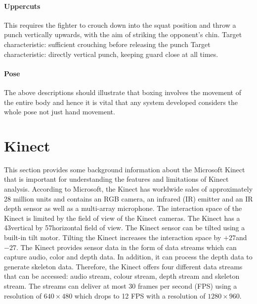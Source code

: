 \paragraph{Uppercuts}
This requires the fighter to crouch down into the squat position and throw a punch vertically upwards, with the aim of striking the opponent's chin.\newline
Target characteristic: sufficient crouching before releasing the punch\newline
Target characteristic: directly vertical punch, keeping guard close at all times.\newline

\paragraph{Pose}
The above descriptions should illustrate that boxing involves the movement of the entire body and hence it is vital that any system developed considers the whole pose not just hand movement.

\section{Kinect}
This section provides some background information about the Microsoft Kinect that is important for understanding the features and limitations of Kinect analysis. According to Microsoft, the Kinect  has worldwide sales of approximately 28 million units and contains an RGB camera, an infrared (IR) emitter and an IR depth sensor as well as a multi-array microphone. The interaction space of the Kinect is limited by the field of view of the Kinect cameras. The Kinect has a 43\degree  vertical by 57\degree  horizontal field of view. The Kinect sensor can be tilted using a built-in tilt motor. Tilting the Kinect increases the interaction space by $+27$\degree and $-27$\degree.
The Kinect provides sensor data in the form of data streams which can capture audio, color and depth data. In addition, it can process the depth data to generate skeleton data. Therefore, the Kinect offers four different data streams that can be accessed: audio stream, colour stream, depth stream and skeleton stream. The streams can deliver at most 30 frames per second (FPS) using a resolution of $640\times480$ which drops to 12 FPS with a resolution of $1280\times960$.

